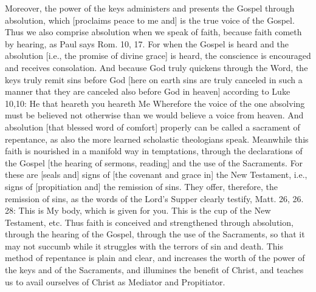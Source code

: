 Moreover, the power of the keys administers and presents the Gospel
through absolution, which [proclaims peace to me and] is the true
voice of the Gospel.  Thus we also comprise absolution when we speak
of faith, because faith cometh by hearing, as Paul says Rom. 10, 17.
For when the Gospel is heard and the absolution [i.e., the promise of
divine grace] is heard, the conscience is encouraged and receives
consolation.  And because God truly quickens through the Word, the
keys truly remit sins before God [here on earth sins are truly
canceled in such a manner that they are canceled also before God in
heaven] according to Luke 10,10: He that heareth you heareth Me
Wherefore the voice of the one absolving must be believed not
otherwise than we would believe a voice from heaven.  And absolution
[that blessed word of comfort] properly can be called a sacrament of
repentance, as also the more learned scholastic theologians speak.
Meanwhile this faith is nourished in a manifold way in temptations,
through the declarations of the Gospel [the hearing of sermons,
reading] and the use of the Sacraments.  For these are [seals and]
signs of [the covenant and grace in] the New Testament, i.e., signs
of [propitiation and] the remission of sins.  They offer, therefore,
the remission of sins, as the words of the Lord's Supper clearly
testify, Matt. 26, 26. 28: This is My body, which is given for you.
This is the cup of the New Testament, etc. Thus faith is conceived
and strengthened through absolution, through the hearing of the
Gospel, through the use of the Sacraments, so that it may not succumb
while it struggles with the terrors of sin and death.  This method of
repentance is plain and clear, and increases the worth of the power
of the keys and of the Sacraments, and illumines the benefit of
Christ, and teaches us to avail ourselves of Christ as Mediator and
Propitiator.

